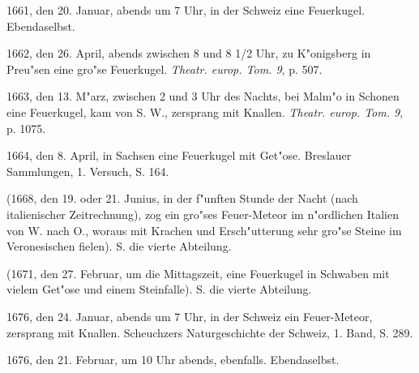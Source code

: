 \documentclass[a4paper, 11pt, oneside, polutonikogreek, german]{article}
\begin{document}
1661, den 20. Januar, abends um 7 Uhr, in der Schweiz eine Feuerkugel. Ebendaselbst.

1662, den 26. April, abends zwischen 8 und 8 1/2 Uhr, zu K"onigsberg in Preu"sen eine gro"se Feuerkugel. \emph{Theatr. europ. Tom. 9}, p. 507.

1663, den 13. M"arz, zwischen 2 und 3 Uhr des Nachts, bei Malm"o in Schonen eine Feuerkugel, kam von S. W., zersprang mit Knallen. \emph{Theatr. europ. Tom. 9}, p. 1075.

1664, den 8. April, in Sachsen eine Feuerkugel mit Get"ose. Breslauer Sammlungen, 1. Versuch, S. 164.

(1668, den 19. oder 21. Junius, in der f"unften Stunde der Nacht (nach italienischer Zeitrechnung), zog ein gro"ses Feuer-Meteor im n"ordlichen Italien von W. nach O., woraus mit Krachen und Ersch"utterung sehr gro"se Steine im Veronesischen fielen). S. die vierte Abteilung.

(1671, den 27. Februar, um die Mittagszeit, eine Feuerkugel in Schwaben mit vielem Get"ose und einem Steinfalle). S. die vierte Abteilung.

1676, den 24. Januar, abends um 7 Uhr, in der Schweiz ein Feuer-Meteor, zersprang mit Knallen. Scheuchzers Naturgeschichte der Schweiz, 1. Band, S. 289.

1676, den 21. Februar, um 10 Uhr abends, ebenfalls. Ebendaselbst.
\end{document}
